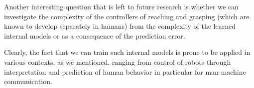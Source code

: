 Another interesting question that is left to future research is whether
we can investigate the complexity of the controllers of reaching and
grasping (which are known to develop separately in humans) from the
complexity of the learned internal models or as a consequence of the 
prediction error. 

Clearly, the fact that we can train such internal models is prone to
be applied in various contexts, as we mentioned, ranging from control
of robots through interpretation and prediction of human behavior in
particular for man-machine communication.




